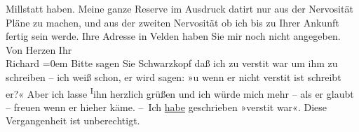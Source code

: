 \begin{ledgroupsized}[t]{13cm}
                  Millstatt haben.\pend
           \pstart
           Meine ganze Reserve im Ausdruck datirt nur aus der Nervosi{\pb}tät Pläne zu machen, und aus der
                  zweiten\strikeout{,} Nervosität ob ich bis zu Ihrer Ankunft
                  fertig sein werde. Ihre
               Adresse in Velden haben Sie mir noch nicht
               angegeben. Von Herzen\pend
           \pstart
           Ihr{\\[\baselineskip]}\spacefill\mbox{Richard}\pend
           \leftskip=0em{}\pstart
           \noindent{}Bitte sagen Sie Schwarzkopf daß ich zu
                     versti{\geminationm}t war um ihm zu schreiben – ich weiß schon,
                  er wird sagen: »u wenn er nicht {\pb}versti{\geminationm}t ist schreibt er?« Aber ich lasse \substVorne{}\textsuperscript{I}\substDazwischen{}i\substHinten{}hn herzlich grüßen und ich würde mich mehr – als er glaubt – freuen wenn
                  er hieher käme.\pend
           \pstart
           – Ich \uline{habe} geschrieben »versti{\geminationm}t war«. Diese Vergangenheit ist unberechtigt.\pend
           
         
         \endnumbering{}\end{ledgroupsized}  \newcommand{\dateiname}{L00942}\newcommand{\titel}{Richard Beer-Hofmann an Arthur Schnitzler, 14. 7. 1899}\newcommand{\editorInnen}{Martin Anton Müller und Gerd-Hermann Susen}
      